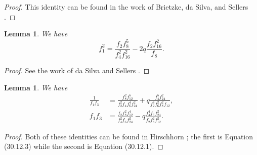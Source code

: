 \documentclass{amsart}
\newtheorem{lemma}[theorem]{Lemma}
\begin{document}
\begin{proof}
This identity can be found in the work of Brietzke, da Silva, and Sellers \cite[Equation (18)]{BSS}. 
\end{proof}

\begin{lemma}
\label{L12}
We have
$$
f_1^2  = \frac{f_2f_8^5}{f_4^2f_{16}^2} - 2q \frac{f_2f_{16}^2}{f_8}.
$$
\end{lemma}

\begin{proof}
See the work of da Silva and Sellers \cite[Equation (12), Lemma 1]{dSS}. 
\end{proof}




\begin{lemma}
We have
\begin{align*}
\frac{1}{f_1f_3} & = \frac{f_8^2f_{12}^5}{f_2^2f_4f_6^4f_{24}^2} + q \frac{f_4^5f_{24}^2}{f_2^4f_6^2f_8^2f_{12}}, \\  
f_1f_3 & = \frac{f_2f_8^2f_{12}^4}{f_4^2f_6f_{24}^2} - q \frac{f_4^4f_6f_{24}^2}{f_2f_8^2f_{12}^2}. 
\end{align*}
\label{L3}
\end{lemma}

\begin{proof}
Both of these identities can be found in Hirschhorn \cite{H}; the first is Equation (30.12.3) while the second is Equation (30.12.1).
\end{proof}


\end{document}
